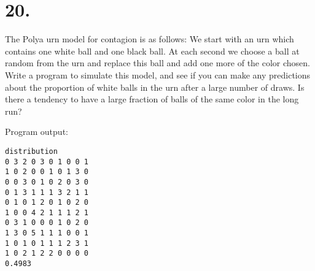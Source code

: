 \section*{20.}
The Polya urn model for contagion is as follows: We start with an urn which
contains one white ball and one black ball. At each second we choose a ball
at random from the urn and replace this ball and add one more of the color
chosen. Write a program to simulate this model, and see if you can make
any predictions about the proportion of white balls in the urn after a large
number of draws. Is there a tendency to have a large fraction of balls of the
same color in the long run?

\bigskip
\noindent
Program output:
\begin{verbatim}
distribution
0 3 2 0 3 0 1 0 0 1
1 0 2 0 0 1 0 1 3 0
0 0 3 0 1 0 2 0 3 0
0 1 3 1 1 1 3 2 1 1
0 1 0 1 2 0 1 0 2 0
1 0 0 4 2 1 1 1 2 1
0 3 1 0 0 0 1 0 2 0
1 3 0 5 1 1 1 0 0 1
1 0 1 0 1 1 1 2 3 1
1 0 2 1 2 2 0 0 0 0
0.4983
\end{verbatim}

